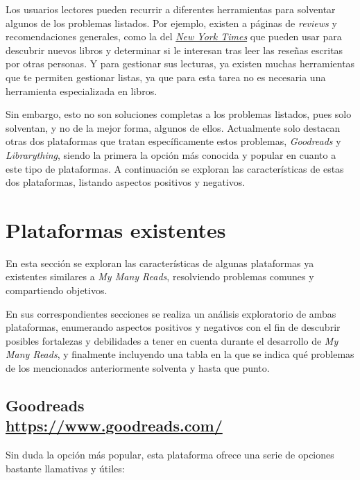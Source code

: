 Los usuarios lectores pueden recurrir a diferentes herramientas para solventar algunos de los problemas listados. Por ejemplo, existen a páginas de \textit{reviews} y recomendaciones generales, como la del \href{https://www.nytimes.com/international/section/books/review}{\textit{New York Times}} que pueden usar para descubrir nuevos libros y determinar si le interesan tras leer las reseñas escritas por otras personas. Y para gestionar sus lecturas, ya existen muchas herramientas que te permiten gestionar listas, ya que para esta tarea no es necesaria una herramienta especializada en libros. 

Sin embargo, esto no son soluciones completas a los problemas listados, pues solo solventan, y no de la mejor forma, algunos de ellos. Actualmente solo destacan otras dos plataformas que tratan específicamente estos problemas, \textit{Goodreads} y \textit{Librarything}, siendo la primera la opción más conocida y popular en cuanto a este tipo de plataformas. A continuación se exploran las características de estas dos plataformas, listando aspectos positivos y negativos.

\section{Plataformas existentes}

En esta sección se exploran las características de algunas plataformas ya existentes similares a \textit{My Many Reads}, resolviendo problemas comunes y compartiendo objetivos.

En sus correspondientes secciones se realiza un análisis exploratorio de ambas plataformas, enumerando aspectos positivos y negativos con el fin de descubrir posibles fortalezas y debilidades a tener en cuenta durante el desarrollo de \textit{My Many Reads}, y finalmente incluyendo una tabla en la que se indica qué problemas de los mencionados anteriormente solventa y hasta que punto.

\subsection[Goodreads]{Goodreads\\ {\large \url{https://www.goodreads.com/}}}

Sin duda la opción más popular, esta plataforma ofrece una serie de opciones bastante llamativas y útiles:

